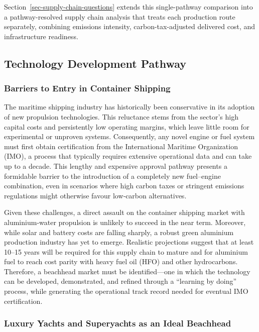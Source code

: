 \documentclass[12pt]{article}
\begin{document}
Section~\ref{sec-supply-chain-questions} extends this single-pathway comparison into a pathway-resolved supply chain analysis that treats each production route separately, combining emissions intensity, carbon-tax-adjusted delivered cost, and infrastructure readiness.

\break

\subsection{Technology Development Pathway}

\subsubsection{Barriers to Entry in Container Shipping}

The maritime shipping industry has historically been conservative in its adoption of new propulsion technologies. This reluctance stems from the sector’s high capital costs and persistently low operating margins, which leave little room for experimental or unproven systems. Consequently, any novel engine or fuel system must first obtain certification from the International Maritime Organization (IMO), a process that typically requires extensive operational data and can take up to a decade. This lengthy and expensive approval pathway presents a formidable barrier to the introduction of a completely new fuel–engine combination, even in scenarios where high carbon taxes or stringent emissions regulations might otherwise favour low‑carbon alternatives.

Given these challenges, a direct assault on the container shipping market with aluminium‑water propulsion is unlikely to succeed in the near term. Moreover, while solar and battery costs are falling sharply, a robust green aluminium production industry has yet to emerge. Realistic projections suggest that at least 10–15 years will be required for this supply chain to mature and for aluminium fuel to reach cost parity with heavy fuel oil (HFO) and other hydrocarbons. Therefore, a beachhead market must be identified—one in which the technology can be developed, demonstrated, and refined through a “learning by doing” process, while generating the operational track record needed for eventual IMO certification. \cite{tesla-beachhead}

\subsubsection{Luxury Yachts and Superyachts as an Ideal Beachhead}
\end{document}
